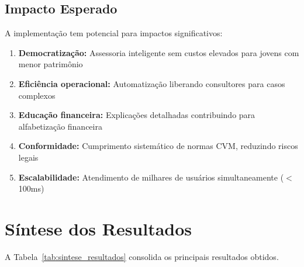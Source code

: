 \subsection{Impacto Esperado}

A implementação tem potencial para impactos significativos:

\begin{enumerate}
    \item \textbf{Democratização:} Assessoria inteligente sem custos elevados para jovens com menor patrimônio
    \item \textbf{Eficiência operacional:} Automatização liberando consultores para casos complexos
    \item \textbf{Educação financeira:} Explicações detalhadas contribuindo para alfabetização financeira
    \item \textbf{Conformidade:} Cumprimento sistemático de normas CVM, reduzindo riscos legais
    \item \textbf{Escalabilidade:} Atendimento de milhares de usuários simultaneamente ($<$ 100ms)
\end{enumerate}

\section{Síntese dos Resultados}

A Tabela~\ref{tab:sintese_resultados} consolida os principais resultados obtidos.

